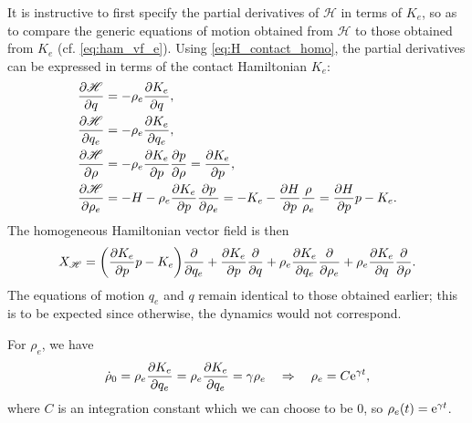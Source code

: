 It is instructive to first specify the partial derivatives of \(\mathscr{H}\) in terms of \(K_e\), so as to compare the generic equations of motion obtained from \(\mathscr{H}\) to those obtained from \(K_e\) (cf. \cref{eq:ham_vf_e}). Using \cref{eq:H_contact_homo}, the partial derivatives can be expressed in terms of the contact Hamiltonian \(K_e\):
\begin{equation}
    \begin{split}
        \pdv{\mathscr{H}}{q} &= -\rho_e \pdv{K_e}{q}, \\
        \pdv{\mathscr{H}}{q_e} &= -\rho_e \pdv{K_e}{q_e}, \\
        \pdv{\mathscr{H}}{\rho} &= -\rho_e \pdv{K_e}{p}\pdv{p}{\rho} = \pdv{K_e}{p}, \\
        \pdv{\mathscr{H}}{\rho_e} &= -H - \rho_e \pdv{K_e}{p}\pdv{p}{\rho_e} = -K_e - \pdv{H}{p}\frac{\rho}{\rho_e} = \pdv{H}{p}p - K_e.\\
    \end{split}
\end{equation}
The homogeneous Hamiltonian vector field is then
\begin{equation}
    X_\mathscr{H} = \qty(\pdv{K_e}{p}p - K_e)\pdv{}{q_e}
                    + \pdv{K_e}{p}\pdv{}{q}
                    + \rho_e\pdv{K_e}{q_e}\pdv{}{\rho_e}
                    + \rho_e\pdv{K_e}{q}\pdv{}{\rho}.
    \label{eq:hom_ham_vf}
\end{equation}
The equations of motion \(q_e\) and \(q\) remain identical to those obtained earlier; this is to be expected since otherwise, the dynamics would not correspond. 

For \(\rho_e\), we have
\begin{equation}
     \dot{\rho}_0 = \rho_e \pdv{K_e}{q_e} = \rho_e \pdv{K_e}{q_e}  = \gamma\rho_e \quad \Rightarrow \quad \rho_e = C\mathrm{e}^{\gamma t},
\end{equation} 
where \(C\) is an integration constant which we can choose to be 0, so \(\rho_e(t) = \mathrm{e}^{\gamma t}\).


